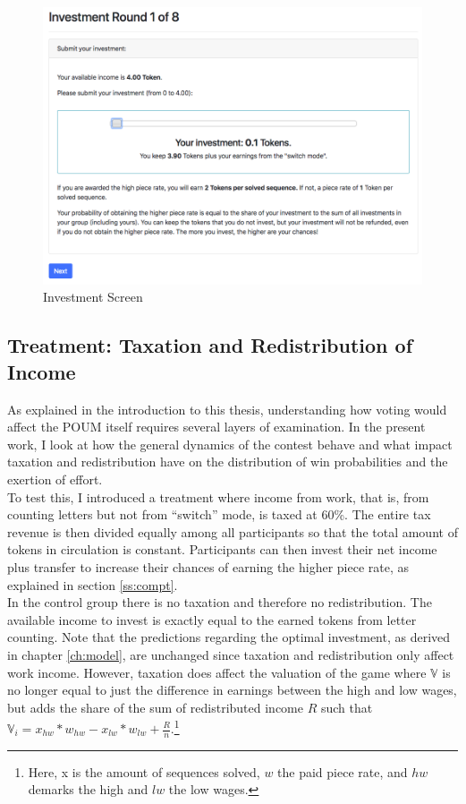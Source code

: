     \begin{figure}[h!]
        \centering
        \includegraphics[scale = 0.4]{graphs/screen_invest.png}
        \caption{Investment Screen}
        \label{fig:screen_invest}
    \end{figure}
    \vspace{-2mm}
    
    \subsection{Treatment: Taxation and Redistribution of Income}
    \label{sec:treat}
    
    As explained in the introduction to this thesis, understanding how voting would affect the POUM itself requires several layers of examination. In the present work, I look at how the general dynamics of the contest behave and what impact taxation and redistribution have on the distribution of win probabilities and the exertion of effort.\\
    
    To test this, I introduced a treatment where income from work, that is, from counting letters but not from ``switch'' mode, is taxed at 60\%. The entire tax revenue is then divided equally among all participants so that the total amount of tokens in circulation is constant. Participants can then invest their net income plus transfer to increase their chances of earning the higher piece rate, as explained in section \ref{ss:compt}.\\
    
    In the control group there is no taxation and therefore no redistribution. The available income to invest is exactly equal to the earned tokens from letter counting. Note that the predictions regarding the optimal investment, as derived in chapter \ref{ch:model}, are unchanged since taxation and redistribution only affect work income. However, taxation does affect the valuation of the game where $\mathbb{V}$ is no longer equal to just the difference in earnings between the high and low wages, but adds the share of the sum of redistributed income $R$ such that $\mathbb{V}_i = x_{hw}*w_{hw} - x_{lw}*w_{lw} + \frac{R}{n}$.\footnote{Here, x is the amount of sequences solved, $w$ the paid piece rate, and $hw$ demarks the high and $lw$ the low wages.}  
    

